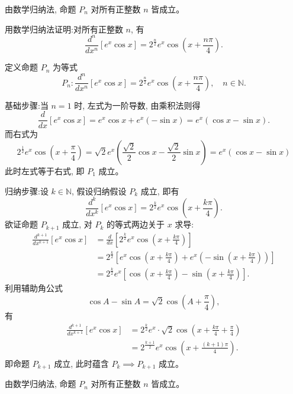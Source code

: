 \begin{questions}
\begin{solution}
        由数学归纳法, 命题 $P_n$ 对所有正整数 $n$ 皆成立。
    \end{solution}

    \question 用数学归纳法证明:对所有正整数 $n$, 有
    \[
    \frac{d^n}{dx^n} [e^x \cos x] = 2^{\frac{n}{2}} e^x \cos\left(x + \frac{n\pi}{4}\right).
    \]
    \begin{solution}
        定义命题 $P_n$ 为等式
        \[
        P_n:\frac{d^n}{dx^n} [e^x \cos x] = 2^{\frac{n}{2}} e^x \cos\left(x + \frac{n\pi}{4}\right), \quad n \in \mathbb{N}.
        \]

        基础步骤:当 $n=1$ 时, 左式为一阶导数, 由乘积法则得
        \[
        \frac{d}{dx} [e^x \cos x] = e^x \cos x + e^x (-\sin x) = e^x (\cos x - \sin x).
        \]
        而右式为
        \[
        2^{\frac{1}{2}} e^x \cos\left(x + \frac{\pi}{4}\right) = \sqrt{2} e^x \left( \frac{\sqrt{2}}{2}\cos x - \frac{\sqrt{2}}{2}\sin x \right) = e^x (\cos x - \sin x)
        \]
        此时左式等于右式, 即 $P_1$ 成立。

        归纳步骤:设 $k \in \mathbb{N}$, 假设归纳假设 $P_k$ 成立, 即有
        \[
        \frac{d^k}{dx^k} [e^x \cos x] = 2^{\frac{k}{2}} e^x \cos\left(x + \frac{k\pi}{4}\right).
        \]
        欲证命题 $P_{k+1}$ 成立, 对 $P_k$ 的等式两边关于 $x$ 求导:
        \begin{align}
        \frac{d^{k+1}}{dx^{k+1}} [e^x \cos x] &= \frac{d}{dx} \left[ 2^{\frac{k}{2}} e^x \cos\left(x + \frac{k\pi}{4}\right) \right] \\
        &= 2^{\frac{k}{2}} \left[ e^x \cos\left(x + \frac{k\pi}{4}\right) + e^x \left( -\sin\left(x + \frac{k\pi}{4}\right) \right) \right] \\
        &= 2^{\frac{k}{2}} e^x \left[ \cos\left(x + \frac{k\pi}{4}\right) - \sin\left(x + \frac{k\pi}{4}\right) \right].
        \end{align}
        利用辅助角公式 
        \[
        \cos A - \sin A = \sqrt{2} \cos(A + \frac{\pi}{4}),
        \]
        有
        \begin{align}
        \frac{d^{k+1}}{dx^{k+1}} [e^x \cos x] &= 2^{\frac{k}{2}} e^x \cdot \sqrt{2} \cos\left(x + \frac{k\pi}{4} + \frac{\pi}{4}\right) \\
        &= 2^{\frac{k+1}{2}} e^x \cos\left(x + \frac{(k+1)\pi}{4}\right).
        \end{align}
        即命题 $P_{k+1}$ 成立, 此时蕴含 $P_k \implies P_{k+1}$ 成立。

        由数学归纳法, 命题 $P_n$ 对所有正整数 $n$ 皆成立。
    \end{solution}


\end{questions}

